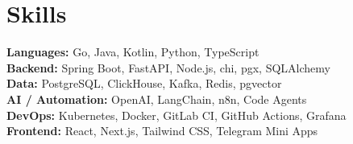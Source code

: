 \documentclass[11pt,a4paper]{article}
\begin{document}
\section{Skills}

\textbf{Languages:} Go, Java, Kotlin, Python, TypeScript \\
\textbf{Backend:} Spring Boot, FastAPI, Node.js, chi, pgx, SQLAlchemy \\
\textbf{Data:} PostgreSQL, ClickHouse, Kafka, Redis, pgvector \\
\textbf{AI / Automation:} OpenAI, LangChain, n8n, Code Agents \\
\textbf{DevOps:} Kubernetes, Docker, GitLab CI, GitHub Actions, Grafana \\
\textbf{Frontend:} React, Next.js, Tailwind CSS, Telegram Mini Apps \\
\end{document}
